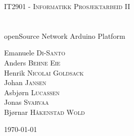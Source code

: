 \begin{titlepage}
	\begin{center}
		\textsc{\Large IT2901 - Informatikk Prosjektarbeid II}\\[0.5cm]
		\HRule \\[0.6cm]
		{ \huge \bfseries \project}\\[0.4cm]
		openSource Network Arduino Platform
		\HRule \\[1.5cm]
		\begin{center} \large
			Emanuele \textsc{Di-Santo} \\
			Anders \textsc{Behne Eie} \\
			Henrik \textsc{Nicolai Goldsack} \\
			Johan \textsc{Jansen} \\
			Asbjørn \textsc{Lucassen} \\
			Jonas \textsc{Svarvaa} \\
			Bjørnar \textsc{Håkenstad Wold}
		\end{center}
		\vfill
		{\large \today}
	\end{center}
\end{titlepage}
